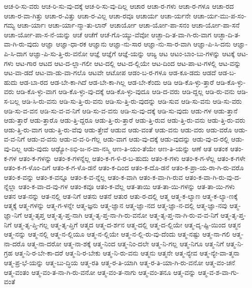 {ಆಚ-ರಿ-ಸು-ವರು
ಆಚ-ರಿ-ಸು-ವು-ದಕ್ಕೆ
ಆಚ-ರಿ-ಸು-ವು-ದಿಲ್ಲ
ಆಚಾರ
ಆಚಾ-ರ-ಗಳು
ಆಚಾ-ರ-ಗಳೂ
ಆಚಾ-ರದ
ಆಚಾ-ರ-ವಾ-ಗಿತ್ತು
ಆಚಾ-ರ-ವಿತ್ತು
ಆಚಾ-ರ-ವಿಲ್ಲ
ಆಚಾ-ರವೂ
ಆಚಾರ್ಯ
ಆಚಾ-ರ್ಯನೇ
ಆಚಾ-ರ್ಯ-ಮು-ಪ-ಸಂ-ಗಮ್ಯ
ಆಚಾ-ರ್ಯಾಃ
ಆಚಾ-ರ್ಯಾ-ನ್ಮಾ-ತು-ಲಾನ್
ಆಚಾರ್ಯೋ
ಆಚಾ-ರ್ಯೋ-ಪಾ-ಸನಂ
ಆಚಾ-ರ್ಯೋ-ಪಾ-ಸನೆ
ಆಚಾ-ರ್ಯೋ-ಪಾ-ಸ-ನೆ-ಯನ್ನು
ಆಚೆ
ಆಚೆಗೆ
ಆಚೆ-ಗೊ-ಯ್ಯು-ವೆವೋ
ಆಚ್ಛಾ-ದಿ-ತ-ವಾ-ಗಿ-ರು-ವಾಗ
ಆಚ್ಛಾ-ದಿ-ತ-ವಾ-ಗಿ-ರು-ವುದು
ಆಜ್ಞಾ
ಆಜ್ಞಾ-ಧಾ-ರಕ
ಆಜ್ಞಾನು
ಆಜ್ಞಾ-ನು-ಸಾರ
ಆಜ್ಞಾ-ನು-ಸಾ-ರ-ವಾಗಿ
ಆಜ್ಞಾ-ಪಿ-ಸಿ-ದನು
ಆಜ್ಞಾ-ಪಿ-ಸಿ-ದಾಗ
ಆಜ್ಞಾ-ಪಿ-ಸು-ತ್ತಿ-ರು-ವನೋ
ಆಜ್ಞೆ
ಆಜ್ಞೆಗೆ
ಆಜ್ಞೆ-ಯನ್ನು
ಆಜ್ಯ
ಆಟ
ಆಟಂ-ಬಾಂ-ಬು-ಗಳನ್ನು
ಆಟಕ್ಕೆ
ಆಟ-ಗಳು
ಆಟ-ಗಾರ
ಆಟದ
ಆಟ-ದ-ಲ್ಲಾ-ಗಲೀ
ಆಟ-ದಲ್ಲಿ
ಆಟ-ದ-ಲ್ಲಿಯೇ
ಆಟ-ದಿಂದ
ಆಟ-ಪಾ-ಟ-ಗಳಲ್ಲಿ
ಆಟ-ವನ್ನು
ಆಟ-ವಾ-ಡದೆ
ಆಟ-ವಾ-ಡು-ವಾ-ಗಲೊ
ಆಟವೇ
ಆಟೋಪ
ಆಡಂ-ಬ-ರ-ಗಳೂ
ಆಡ-ಕೂ-ಡದು
ಆಡದೆ
ಆಡ-ಬ-ಹುದು
ಆಡ-ಬಾ-ರದ
ಆಡ-ಬೇ-ಕಾ-ಗಿದೆ
ಆಡ-ಬೇ-ಕಾ-ಗಿಲ್ಲ
ಆಡ-ಬೇ-ಕೆಂದು
ಆಡಿ
ಆಡಿ-ಕೊ-ಳ್ಳು-ತ್ತಾರೆ
ಆಡಿ-ಕೊ-ಳ್ಳು-ವರು
ಆಡಿ-ಕೊ-ಳ್ಳು-ವಾಗ
ಆಡಿ-ಕೊ-ಳ್ಳು-ವು-ದಕ್ಕೆ
ಆಡಿ-ಕೊ-ಳ್ಳು-ವುದೂ
ಆಡಿ-ದ-ವರು
ಆಡಿ-ದ್ದಲ್ಲ
ಆಡಿ-ರು-ವನು
ಆಡಿ-ಸ-ಬಲ್ಲ
ಆಡಿ-ಸಿ-ರು-ವನು
ಆಡಿ-ಸು-ತ್ತಿ-ರು-ವನು
ಆಡಿ-ಸು-ತ್ತಿ-ರು-ವುದನ್ನು
ಆಡಿ-ಸುವ
ಆಡಿ-ಸು-ವನು
ಆಡಿ-ಸು-ವರು
ಆಡಿ-ಸು-ವ-ವನ
ಆಡಿ-ಸು-ವ-ವ-ನಿಗೆ
ಆಡಿ-ಸು-ವ-ವನು
ಆಡಿ-ಸು-ವು-ದಕ್ಕೆ
ಆಡಿ-ಸು-ವುದು
ಆಡು-ಗಳ
ಆಡು-ತ್ತಾನೆ
ಆಡು-ತ್ತಾರೆ
ಆಡು-ತ್ತಾರೊ
ಆಡು-ತ್ತಿ-ದ್ದರೂ
ಆಡು-ತ್ತಿ-ರು-ತ್ತಾರೆ
ಆಡು-ತ್ತಿ-ರುವ
ಆಡು-ತ್ತಿ-ರು-ವನು
ಆಡು-ತ್ತಿ-ರು-ವರು
ಆಡು-ತ್ತಿ-ರು-ವಾಗ
ಆಡು-ತ್ತಿ-ರು-ವೆವು
ಆಡು-ತ್ತೇವೆ
ಆಡುವ
ಆಡು-ವಂತೆ
ಆಡು-ವನು
ಆಡು-ವರು
ಆಡು-ವರೊ
ಆಡು-ವ-ವ-ನಿಗೆ
ಆಡು-ವ-ವನು
ಆಡು-ವ-ವ-ರಿ-ಗೆಲ್ಲ
ಆಡು-ವಾಗ
ಆಡು-ವು-ದಕ್ಕೆ
ಆಡು-ವುದನ್ನು
ಆಡು-ವು-ದ-ರಲ್ಲಿ
ಆಡು-ವು-ದಿಲ್ಲ
ಆಡು-ವುದು
ಆಢ್ಯೋ-ಽಭಿ-ಜ-ನ-ವಾ-ನಸ್ಮಿ
ಆಣ-ತಿ-ಯಂ-ತೆಯೇ
ಆಣ-ತಿ-ಯನ್ನು
ಆಣೆ
ಆತ
ಆತಂಕ
ಆತಂ-ಕ-ಗಳ
ಆತಂ-ಕ-ಗಳನ್ನು
ಆತಂ-ಕ-ಗಳನ್ನೆಲ್ಲ
ಆತಂ-ಕ-ಗ-ಳಿ-ರ-ಬ-ಹುದು
ಆತಂ-ಕ-ಗಳು
ಆತಂ-ಕ-ಗ-ಳೆಲ್ಲ
ಆತಂ-ಕ-ಗಳೇ
ಆತಂ-ಕ-ಗ-ಳೊಂ-ದಿಗೆ
ಆತಂ-ಕ-ಗ-ಳೊ-ಡನೆ
ಆತಂ-ಕ-ದಿಂದ
ಆತಂ-ಕ-ದೊ-ಡನೆ
ಆತಂ-ಕ-ಪ್ರಾ-ಯ-ರಾ-ಗಿ-ರು-ವರೊ
ಆತಂ-ಕ-ವನ್ನು
ಆತಂ-ಕ-ವನ್ನೂ
ಆತಂ-ಕ-ವ-ನ್ನೆಲ್ಲ
ಆತಂ-ಕ-ವಾಗಿ
ಆತಂ-ಕ-ವಾ-ಗಿ-ರುವ
ಆತಂ-ಕ-ವಾ-ಗಿ-ರು-ವು-ದ-ನ್ನೆಲ್ಲಾ
ಆತಂ-ಕ-ವಾ-ದ-ವು-ಗಳ
ಆತಂ-ಕವೂ
ಆತಂ-ಕ-ವೆಲ್ಲ
ಆತ-ತಾಯಿ
ಆತ-ತಾ-ಯಿ-ಗಳನ್ನು
ಆತ-ತಾ-ಯಿ-ಗಳು
ಆತನ
ಆತ-ನನ್ನು
ಆತ-ನಲ್ಲಿ
ಆತ-ನಿಗೆ
ಆತನು
ಆತನೆ
ಆತುರ
ಆತು-ರ-ದಲ್ಲಿ
ಆತ್ಮ
ಆತ್ಮ-ಕ-ಲ್ಯಾಣ
ಆತ್ಮ-ಕ-ಲ್ಯಾ-ಣಕ್ಕೆ
ಆತ್ಮಕ್ಕೆ
ಆತ್ಮ-ಗಳನ್ನು
ಆತ್ಮ-ಗ-ಳನ್ನೇ
ಆತ್ಮ-ಜ್ಞನು
ಆತ್ಮ-ಜ್ಞಾನ
ಆತ್ಮ-ಜ್ಞಾ-ನದ
ಆತ್ಮ-ಜ್ಞಾ-ನ-ದಲ್ಲಿ
ಆತ್ಮ-ಜ್ಞಾ-ನವು
ಆತ್ಮ-ಜ್ಞಾ-ನಿಗೆ
ಆತ್ಮ-ತೃಪ್ತ
ಆತ್ಮ-ತೃ-ಪ್ತ-ನಾಗಿ
ಆತ್ಮ-ತೃ-ಪ್ತ-ನಾ-ಗಿ-ರು-ವನೋ
ಆತ್ಮ-ತೃ-ಪ್ತ-ನಾ-ಗಿ-ರು-ವ-ವ-ನಿಗೆ
ಆತ್ಮ-ತೃ-ಪ್ತ-ನಿಗೆ
ಆತ್ಮ-ತೃ-ಪ್ತಿ-ಗಲ್ಲ
ಆತ್ಮ-ತೃ-ಪ್ತಿಗೆ
ಆತ್ಮದ
ಆತ್ಮ-ದ-ರ್ಶನ
ಆತ್ಮ-ದಲ್ಲಿ
ಆತ್ಮ-ದ-ಲ್ಲಿಯೇ
ಆತ್ಮ-ದೃ-ಷ್ಟಿ-ಯಿಂದ
ಆತ್ಮನ
ಆತ್ಮ-ನನ್ನು
ಆತ್ಮ-ನಲ್ಲಿ
ಆತ್ಮ-ನ-ಲ್ಲಿಯೂ
ಆತ್ಮ-ನ-ಲ್ಲಿಯೇ
ಆತ್ಮ-ನ-ಲ್ಲಿ-ರು-ವು-ದೆಂದು
ಆತ್ಮ-ನಷ್ಟು
ಆತ್ಮ-ನಾ-ಗಲಿ
ಆತ್ಮ-ನಾ-ದರೊ
ಆತ್ಮ-ನಾ-ದರೋ
ಆತ್ಮ-ನಾ-ಶಕ್ಕೆ
ಆತ್ಮ-ನಿಂದ
ಆತ್ಮ-ನಿಂ-ದಲೇ
ಆತ್ಮ-ನಿ-ಗಲ್ಲ
ಆತ್ಮ-ನಿಗೂ
ಆತ್ಮ-ನಿಗೆ
ಆತ್ಮ-ನಿ-ಗ್ರಹ
ಆತ್ಮ-ನಿ-ರ-ಬೇ-ಕಾ-ದರೆ
ಆತ್ಮ-ನಿ-ರ-ಬೇಕು
ಆತ್ಮ-ನಿ-ರು-ವನು
ಆತ್ಮನು
ಆತ್ಮನೇ
ಆತ್ಮ-ನ್ಯೇವ
ಆತ್ಮ-ನ್ಯೇ-ವಾ-ತ್ಮನಾ
ಆತ್ಮ-ಪ್ರ-ಭೆ-ಯನ್ನು
ಆತ್ಮ-ಬು-ದ್ಧಿಯ
ಆತ್ಮ-ರತಿ
ಆತ್ಮ-ರ-ತಿ-ಯಾಗಿ
ಆತ್ಮ-ರ-ತಿ-ಯಾ-ಗಿ-ರು-ವನೋ
ಆತ್ಮ-ವಂ-ಚನೆ
ಆತ್ಮ-ವಂತಂ
ಆತ್ಮ-ವಂ-ತ-ನಾ-ಗಿ-ರು-ವನೋ
ಆತ್ಮ-ವಂ-ತ-ನಾಗು
ಆತ್ಮ-ವಂ-ತನೂ
ಆತ್ಮ-ವನ್ನು
ಆತ್ಮ-ವ-ಶ-ವಾ-ಗು-ವಂತೆ
}
